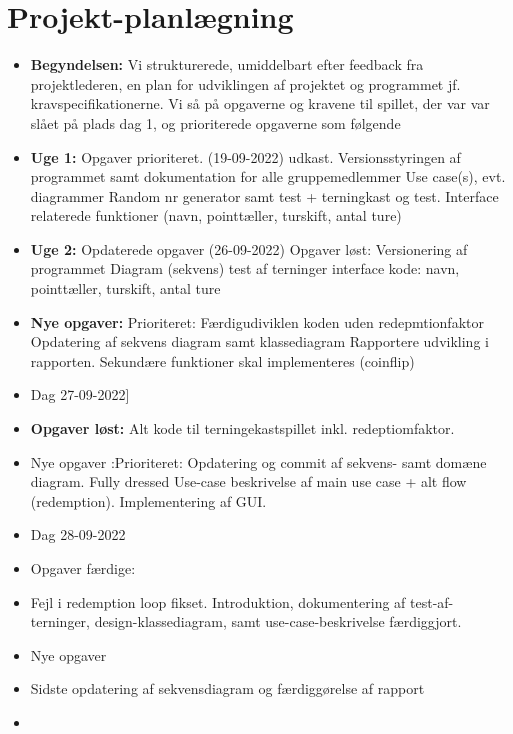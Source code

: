 \documentclass{article}
\begin{document}
\section{Projekt-planlægning}
\begin {itemize}
\item [\textbf{Begyndelsen:}]Vi strukturerede, umiddelbart efter feedback fra projektlederen, en plan for udviklingen af projektet og programmet jf. kravspecifikationerne. Vi så på opgaverne og kravene til spillet, der var var slået på plads dag 1, og prioriterede opgaverne som følgende
 \item [\textbf{Uge 1:}]
 Opgaver prioriteret. (19-09-2022) udkast.
Versionsstyringen af programmet samt dokumentation for alle gruppemedlemmer
Use case(s), evt. diagrammer
Random nr generator samt test + terningkast og test.
Interface relaterede funktioner (navn, pointtæller, turskift, antal ture)
\item [\textbf{Uge 2:}]
Opdaterede opgaver (26-09-2022)
Opgaver løst:
Versionering af programmet
Diagram (sekvens)
test af terninger
interface kode: navn, pointtæller, turskift, antal ture
\item [\textbf{Nye opgaver:}]
Prioriteret:
Færdigudiviklen koden uden redepmtionfaktor
Opdatering af sekvens diagram samt klassediagram
Rapportere udvikling i rapporten.
Sekundære funktioner skal implementeres (coinflip)
\item []Dag 27-09-2022]
\item [\textbf{Opgaver løst:}] Alt kode til terningekastspillet inkl. redeptiomfaktor.
\item [Nye opgaver]:Prioriteret: Opdatering og commit af sekvens- samt domæne diagram. Fully dressed Use-case beskrivelse af main use case + alt flow (redemption). Implementering af GUI.
\item [Dag 28-09-2022]
\item Opgaver færdige:
\item Fejl i redemption loop fikset. Introduktion, dokumentering af test-af-terninger, design-klassediagram, samt use-case-beskrivelse færdiggjort.

\item [Nye opgaver]
\item Sidste opdatering af sekvensdiagram og færdiggørelse af rapport
\item 
\end {itemize}

 
\end{document}
